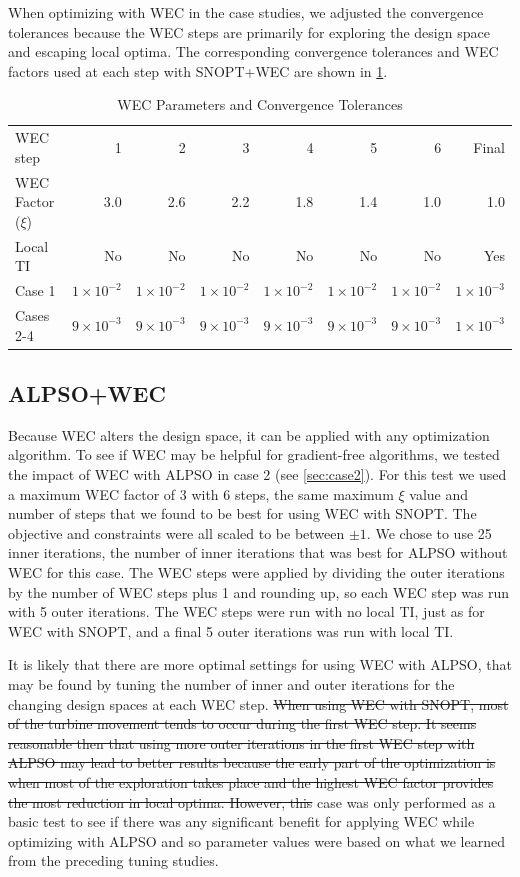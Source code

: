 \documentclass[hidelinks,sort&compress,AMA,STIX1COL]{WileyNJD-v2}
\providecommand{\DIFadd}[1]{{\protect\color{blue}\uwave{#1}}} %
\providecommand{\DIFdel}[1]{{\protect\color{red}\sout{#1}}}                      %
\providecommand{\DIFaddbegin}{} %
\providecommand{\DIFaddend}{} %
\providecommand{\DIFdelbegin}{} %
\providecommand{\DIFdelend}{} %
\newcommand{\DIFscaledelfig}{0.5}
\newlength{\DIFdelgraphicswidth} %
\newlength{\DIFdelgraphicsheight} %
\newcommand{\DIFaddincludegraphics}[2][]{{\color{blue}\fbox{\DIFOincludegraphics[#1]{#2}}}} %
\newcommand{\DIFdelincludegraphics}[2][]{%
\sbox{\DIFdelgraphicsbox}{\DIFOincludegraphics[#1]{#2}}%
\settoboxwidth{\DIFdelgraphicswidth}{\DIFdelgraphicsbox} %
\settoboxtotalheight{\DIFdelgraphicsheight}{\DIFdelgraphicsbox} %
\scalebox{\DIFscaledelfig}{%
\parbox[b]{\DIFdelgraphicswidth}{\usebox{\DIFdelgraphicsbox}\\[-\baselineskip] \rule{\DIFdelgraphicswidth}{0em}}\llap{\resizebox{\DIFdelgraphicswidth}{\DIFdelgraphicsheight}{%
\setlength{\unitlength}{\DIFdelgraphicswidth}%
\begin{picture}(1,1)%
\thicklines\linethickness{2pt} %
{\color[rgb]{1,0,0}\put(0,0){\framebox(1,1){}}}%
{\color[rgb]{1,0,0}\put(0,0){\line( 1,1){1}}}%
{\color[rgb]{1,0,0}\put(0,1){\line(1,-1){1}}}%
\end{picture}%
}\hspace*{3pt}}} %
} %
\DeclareRobustCommand{\DIFaddbegin}{\DIFOaddbegin \let\includegraphics\DIFaddincludegraphics} %
\DeclareRobustCommand{\DIFaddend}{\DIFOaddend \let\includegraphics\DIFOincludegraphics} %
\DeclareRobustCommand{\DIFdelbegin}{\DIFOdelbegin \let\includegraphics\DIFdelincludegraphics} %
\DeclareRobustCommand{\DIFdelend}{\DIFOaddend \let\includegraphics\DIFOincludegraphics} %
\begin{document}
When optimizing with WEC in the case studies, we adjusted the convergence tolerances because the WEC steps are primarily for exploring the design space and escaping local optima. The corresponding convergence tolerances and WEC factors used at each step with SNOPT+WEC are shown in \cref{tab:wectols}. 

\begin{table}[h!]
	\centering
	\caption{WEC Parameters and Convergence Tolerances}
	\label{tab:wectols}
	\begin{tabular}{lrrrrrrr}
		\toprule		
	WEC step & 1 & 2 & 3 & 4 & 5 & 6 & Final \\
	\cmidrule{2-8}
	WEC Factor ($\xi$) & 3.0 & 2.6 & 2.2 & 1.8 & 1.4 & 1.0 & 1.0 \\
	Local TI & No & No & No & No & No & No & Yes \\
	Case 1 &	$1\times10^{-2}$ & $1\times10^{-2}$ & $1\times10^{-2}$ & $1\times10^{-2}$ & $1\times10^{-2}$ & $1\times10^{-2}$ & $1\times10^{-3}$ \\
	Cases 2-4 &	$9\times10^{-3}$ & $9\times10^{-3}$ & $9\times10^{-3}$ & $9\times10^{-3}$ & $9\times10^{-3}$ & $9\times10^{-3}$ & $1\times10^{-3}$ \\
		\bottomrule
	\end{tabular}
\end{table}

\subsection{ALPSO+WEC}
Because WEC alters the design space, it can be applied with any optimization algorithm. To see if WEC may be helpful for gradient-free algorithms, we tested the impact of WEC with ALPSO in case 2 (see \cref{sec:case2}). For this test we used a maximum WEC factor of 3 with 6 steps, the same maximum $\xi$ value and number of steps that we found to be best for using WEC with SNOPT. The objective and constraints were all scaled to be between $\pm1$. We chose to use 25 inner iterations, the number of inner iterations that was best for ALPSO without WEC for this case. The WEC steps were applied by dividing the outer iterations by the number of WEC steps plus 1 and rounding up, so each WEC step was run with 5 outer iterations. The WEC steps were run with no local TI, just as for WEC with SNOPT, and a final 5 outer iterations was run with local TI. 

It is likely that there are more optimal settings for using WEC with ALPSO, that may be found by tuning the number of inner and outer iterations for the changing design spaces at each WEC step. \DIFdelbegin \DIFdel{When using WEC with SNOPT, most of the turbine movement tends to occur during the first WEC step. It seems reasonable then that using more outer iterations in the first WEC step with ALPSO may lead to better results because the early part of the optimization is when most of the exploration takes place and the highest WEC factor provides the most reduction in local optima. However, this }\DIFdelend \DIFaddbegin \DIFadd{This }\DIFaddend case was only performed as a basic test to see if there was any significant benefit for applying WEC while optimizing with ALPSO and so parameter values were based on what we learned from the preceding tuning studies.
\end{document}
